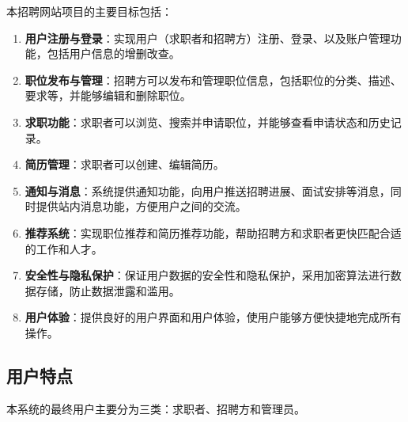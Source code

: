 \documentclass[UTF8,a4paper,10pt]{ctexart}
\begin{document}
本招聘网站项目的主要目标包括：

\begin{enumerate}
    \item \textbf{用户注册与登录}：实现用户（求职者和招聘方）注册、登录、以及账户管理功能，包括用户信息的增删改查。
    \item \textbf{职位发布与管理}：招聘方可以发布和管理职位信息，包括职位的分类、描述、要求等，并能够编辑和删除职位。
    \item \textbf{求职功能}：求职者可以浏览、搜索并申请职位，并能够查看申请状态和历史记录。
    \item \textbf{简历管理}：求职者可以创建、编辑简历。
    \item \textbf{通知与消息}：系统提供通知功能，向用户推送招聘进展、面试安排等消息，同时提供站内消息功能，方便用户之间的交流。
    \item \textbf{推荐系统}：实现职位推荐和简历推荐功能，帮助招聘方和求职者更快匹配合适的工作和人才。
    \item \textbf{安全性与隐私保护}：保证用户数据的安全性和隐私保护，采用加密算法进行数据存储，防止数据泄露和滥用。
    \item \textbf{用户体验}：提供良好的用户界面和用户体验，使用户能够方便快捷地完成所有操作。
\end{enumerate}

\subsection{用户特点}
本系统的最终用户主要分为三类：求职者、招聘方和管理员。
\end{document}
